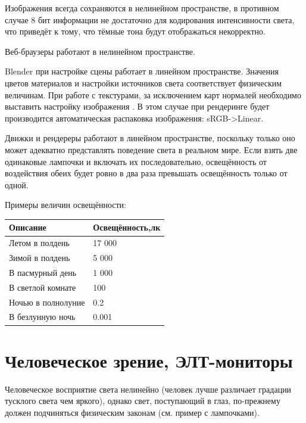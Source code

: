 \documentclass[a4paper,12pt,oneside]{sphinxmanual}
\begin{document}
\begin{DUlineblock}{0em}
\item[] 
\end{DUlineblock}

Изображения всегда сохраняются в нелинейном пространстве, в противном случае 8
бит информации не достаточно для кодирования интенсивности света, что приведёт к
тому, что тёмные тона будут отображаться некорректно.

Веб-браузеры работают в нелинейном пространстве.

Blender при настройке сцены  работает в линейном
пространстве. Значения цветов материалов и настройки источников света
соответствует физическим величинам. При работе с текстурами, за исключением карт
нормалей необходимо выставить настройку изображения .
В этом случае при рендеринге будет производится автоматическая распаковка
изображения: sRGB-\textgreater{}Linear.

Движки и рендереры работают в линейном пространстве, поскольку только оно может
адекватно представлять поведение света в реальном мире. Если взять две
одинаковые лампочки и включать их последовательно, освещённость от воздействия
обеих будет ровно в два раза превышать освещённость только от одной.

Примеры величин освещённости:

\begin{tabulary}{\linewidth}{|L|L|}
\hline
\textsf{\relax 
Описание
} & \textsf{\relax 
Освещённость,лк
}\\
\hline
Летом в полдень
 & 
17 000
\\

Зимой в полдень
 & 
5 000
\\

В пасмурный день
 & 
1 000
\\

В светлой комнате
 & 
100
\\

Ночью в полнолуние
 & 
0.2
\\

В безлунную ночь
 & 
0.001
\\
\hline\end{tabulary}



\section{Человеческое зрение, ЭЛТ-мониторы}
\label{gamma_alpha:id3}
Человеческое восприятие света нелинейно (человек лучше различает градации
тусклого света чем яркого), однако свет, поступающий в глаз,
по-прежнему должен подчиняться физическим законам (см. пример с лампочками).
\end{document}
